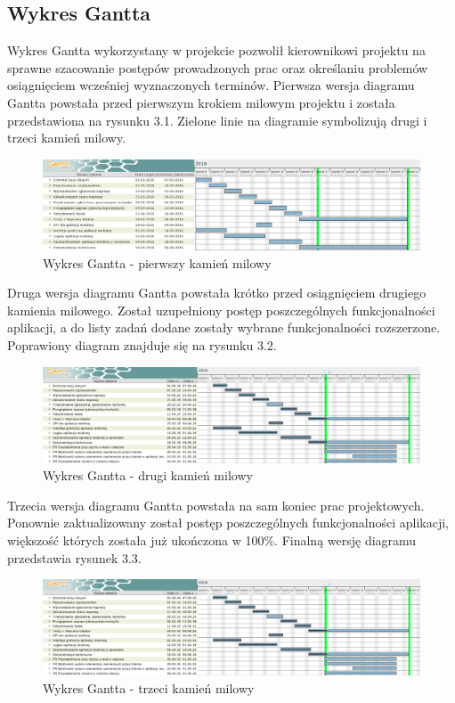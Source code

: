 \documentclass[a4paper,11pt]{article}
\begin{document}
\subsection{Wykres Gantta}
Wykres Gantta wykorzystany w projekcie pozwolił kierownikowi projektu na sprawne szacowanie postępów prowadzonych prac oraz określaniu problemów osiągnięciem wcześniej wyznaczonych terminów. Pierwsza wersja diagramu Gantta powstała przed pierwszym krokiem milowym projektu i została przedstawiona na rysunku 3.1. Zielone linie na diagramie symbolizują drugi i trzeci kamień milowy.
\begin{figure}
	\centering
	\includegraphics[width=\textwidth,height=0.7\textheight]{gannth1.png}
	\caption{Wykres Gantta - pierwszy kamień milowy}
\end{figure}

Druga wersja diagramu Gantta powstała krótko przed osiągnięciem drugiego kamienia milowego. Został uzupełniony postęp poszczególnych funkcjonalności aplikacji, a do listy zadań dodane zostały wybrane funkcjonalności rozszerzone. Poprawiony diagram znajduje się na rysunku 3.2.
\begin{figure}
	\centering
	\includegraphics[width=\textwidth,height=0.7\textheight]{gannth2.png}
	\caption{Wykres Gantta - drugi kamień milowy}
\end{figure}

Trzecia wersja diagramu Gantta powstała na sam koniec prac projektowych. Ponownie zaktualizowany został postęp poszczególnych funkcjonalności aplikacji, większość których została już ukończona w 100\%. Finalną wersję diagramu przedstawia rysunek 3.3.
\begin{figure}
	\centering
	\includegraphics[width=\textwidth,height=0.7\textheight]{gannth3.png}
	\caption{Wykres Gantta - trzeci kamień milowy}
\end{figure}
\end{document}

